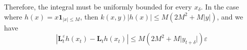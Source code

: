 \documentclass[]{article}
\begin{document}
Therefore, the integral must be uniformly bounded for every
\(x_\delta\). In the case where
\(h(x) = x \mathbf{1}_{\vert x \vert \leq M}\), then
\(k(x, y)\vert h(x) \vert \leq M(2M^2 + M\vert y\vert)\), and we have
\[\left\vert \mathbf{L}_t^\varepsilon h(x_t) - \mathbf{L}_t h(x_t)  \right\vert \leq M(2M^2 + M\vert y_{t + \delta}\vert)\varepsilon\]
\end{document}
